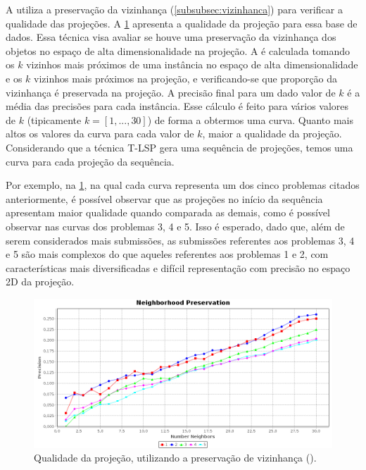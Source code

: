 		A  utiliza a preservação da vizinhança
		(\cref{subsubsec:vizinhanca}) para verificar a qualidade das projeções. A \cref{fig:neighborhoodAPOO30}
		apresenta a qualidade da projeção para essa base de dados. Essa técnica visa avaliar
		se houve uma preservação da vizinhança dos objetos no espaço de alta dimensionalidade
		na projeção. A  é calculada tomando os $k$ vizinhos
		mais próximos de uma instância no espaço de alta dimensionalidade e os $k$ vizinhos
		mais próximos na projeção, e verificando-se que proporção da vizinhança é preservada
		na projeção. A precisão final para um dado valor de $k$ é a média das precisões para
		cada instância. Esse cálculo é feito para vários valores de $k$ (tipicamente $k = [1,...,30]$)
		de forma a obtermos uma curva. Quanto mais altos os valores da curva para cada valor
		de $k$, maior a qualidade da projeção. Considerando que a técnica \acl{T-LSP} \cite{Alencar}
		gera uma sequência de projeções, temos uma curva para cada projeção da
		sequência.
		
		Por exemplo, na \cref{fig:neighborhoodAPOO30}, na qual cada curva representa um dos cinco
		problemas citados anteriormente, é possível observar que as projeções no início da
		sequência apresentam maior qualidade quando comparada as demais, como é possível observar
		nas curvas dos problemas 3, 4 e 5. Isso é esperado, dado que, além de serem considerados
		mais submissões, as submissões referentes aos problemas 3, 4 e 5 são mais complexos do que
		aqueles referentes aos problemas 1 e 2, com características mais diversificadas e difícil
		representação com precisão no espaço 2D da projeção. 
	
		\begin{figure}
			\centering
			\includegraphics[width=0.85\linewidth]{imagem/neighborhoodAPOO30}
			\caption{Qualidade da projeção, utilizando a preservação de vizinhança ().}
			\label{fig:neighborhoodAPOO30}
		\end{figure}	

